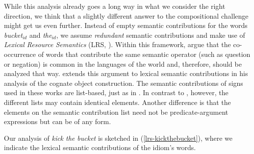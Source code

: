 \documentclass[output=paper]{langsci/langscibook}
\begin{document}


While this analysis already goes a long way in what we consider the right direction, we think that a slightly different answer to the compositional challenge might get us even further. Instead of empty semantic contributions for the words \textit{bucket$_{id}$} and \textit{the$_{id}$}, we assume \emph{redundant} semantic contributions and make use of  \emph{Lexical Resource Semantics} (LRS, \citealt{Richter:Sailer:04}). Within this framework, \cite{Richter:Sailer:01.1,Richter:Sailer:06} argue that the co-occurrence of words that contribute the same semantic operator (such as question or negation) is common in the languages of the world and, therefore, should be analyzed that way. \cite{Sailer:10} extends this argument to lexical semantic contributions in his analysis of the  cognate object construction. The semantic contributions of signs used in these works are list-based, just as in \cite{kaysagidioms}. In contrast to \cite{kaysagidioms}, however, the different lists may contain identical elements. Another dif\-ference is that the elements on the semantic contribution list need not be predicate-argument expressions but can be of any form.

Our analysis of \textit{kick the bucket} is sketched in (\ref{lrs-kickthebucket}), where we indicate the lexical semantic contributions of the idiom's words. 
\end{document}
